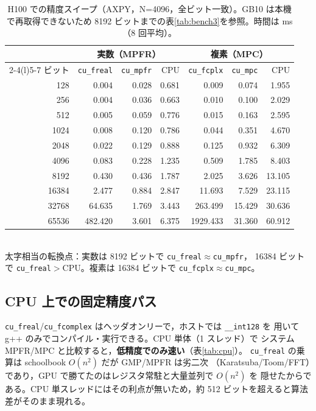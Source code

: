 \documentclass[uplatex,dvipdfmx,a4paper,11pt]{jsarticle}
\newcommand{\code}[1]{\texttt{#1}}
\begin{document}
\begin{table}[h]
\centering
\caption{H100 での精度スイープ（AXPY，N=4096，全ビット一致）。GB10 は本機で再取得できないため
8192 ビットまでの表\ref{tab:bench3}を参照。時間は ms（8 回平均）。}
\label{tab:bench3h100}
\footnotesize
\begin{tabular}{rrrr@{\hskip 1.5em}rrr}
\toprule
 & \multicolumn{3}{c}{実数（MPFR）} & \multicolumn{3}{c}{複素（MPC）}\\
\cmidrule(r){2-4}\cmidrule(l){5-7}
ビット & \code{cu\_freal} & \code{cu\_mpfr} & CPU & \code{cu\_fcplx} & \code{cu\_mpc} & CPU \\
\midrule
128   & 0.004   & 0.028 & 0.681 & 0.009    & 0.074  & 1.955 \\
256   & 0.004   & 0.036 & 0.663 & 0.010    & 0.100  & 2.029 \\
512   & 0.005   & 0.059 & 0.776 & 0.015    & 0.163  & 2.595 \\
1024  & 0.008   & 0.120 & 0.786 & 0.044    & 0.351  & 4.670 \\
2048  & 0.022   & 0.129 & 0.888 & 0.125    & 0.932  & 6.309 \\
4096  & 0.083   & 0.228 & 1.235 & 0.509    & 1.785  & 8.403 \\
8192  & 0.430   & 0.436 & 1.787 & 2.025    & 3.626  & 13.105 \\
16384 & 2.477   & 0.884 & 2.847 & 11.693   & 7.529  & 23.115 \\
32768 & 64.635  & 1.769 & 3.443 & 263.499  & 15.429 & 30.636 \\
65536 & 482.420 & 3.601 & 6.375 & 1929.433 & 31.360 & 60.912 \\
\bottomrule
\end{tabular}\\[2pt]
\footnotesize 太字相当の転換点：実数は 8192 ビットで \code{cu\_freal}$\approx$\code{cu\_mpfr}，
16384 ビットで \code{cu\_freal}$>$CPU。複素は 16384 ビットで \code{cu\_fcplx}$\approx$\code{cu\_mpc}。
\end{table}

\subsection{CPU 上での固定精度パス}

\code{cu\_freal}/\code{cu\_fcomplex} はヘッダオンリーで，ホストでは \code{\_\_int128} を
用いて g++ のみでコンパイル・実行できる。CPU 単体（1 スレッド）で
システム MPFR/MPC と比較すると，\textbf{低精度でのみ速い}（表\ref{tab:cpu}）。
\code{cu\_freal} の乗算は schoolbook $O(n^2)$ だが GMP/MPFR は劣二次
（Karatsuba/Toom/FFT）であり，GPU で勝てたのはレジスタ常駐と大量並列で $O(n^2)$ を
隠せたからである。CPU 単スレッドにはその利点が無いため，約 512 ビットを超えると算法差がそのまま現れる。
\end{document}
